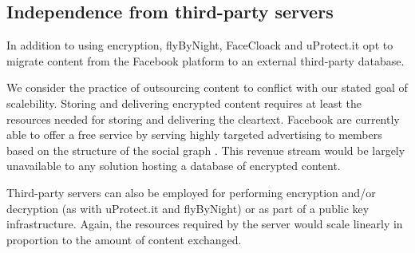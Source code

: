 \FloatBarrier
\subsection{Independence from third-party servers}


In addition to using encryption, flyByNight, FaceCloack and uProtect.it opt to migrate content from the Facebook platform to an external third-party database.

We consider the practice of outsourcing content to conflict with our stated goal of scalebility. Storing and delivering encrypted content requires at least the resources needed for storing and delivering the cleartext. Facebook are currently able to offer a free service by serving highly targeted advertising to members based on the structure of the social graph \cite{fb-ads}. This revenue stream would be largely unavailable to any solution hosting a database of encrypted content.


Third-party servers can also be employed for performing encryption and/or decryption (as with uProtect.it and flyByNight) or as part of a public key infrastructure. Again, the resources required by the server would scale linearly in proportion to the amount of content exchanged.


